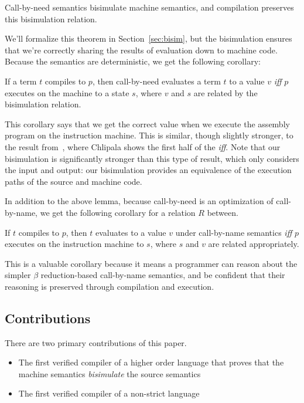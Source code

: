 \begin{theorem}
Call-by-need semantics bisimulate machine semantics, and compilation
preserves this bisimulation relation.
\end{theorem}

We'll formalize this theorem in Section~\ref{sec:bisim}, but the bisimulation
ensures that we're correctly sharing the results of evaluation down to machine
code. Because the semantics are deterministic, we get the following corollary:   

\begin{corollary}
If a term $t$ compiles to $p$, then call-by-need evaluates a term $t$ to a value
$v$ \emph{iff} $p$ executes on the machine to a state $s$, where $v$ and $s$ are
related by the bisimulation relation.
\end{corollary}

This corollary says that we get the correct value when we execute the assembly
program on the instruction machine. This is similar, though slightly stronger,
to the result from~\cite{chlipala2007certified}, where Chlipala shows the first
half of the \emph{iff}. Note that our bisimulation is significantly stronger
than this type of result, which only considers the input and output: our
bisimulation provides an equivalence of the execution paths of the source and
machine code.

In addition to the above lemma, because call-by-need is an optimization of
call-by-name, we get the following corollary for a relation $R$ between.

\begin{corollary}
If $t$ compiles to $p$, then $t$ evaluates to a value $v$ under call-by-name
semantics \emph{iff} $p$ executes on the instruction machine to $s$, where $s$
and $v$ are related appropriately.
\end{corollary}

This is a valuable corollary because it means a programmer can reason about the
simpler $\beta$ reduction-based call-by-name semantics, and be confident that
their reasoning is preserved through compilation and execution.

\subsection{Contributions}
There are two primary contributions of this paper. 
\begin{itemize}
\item The first verified compiler of a higher order language that proves that
the machine semantics \emph{bisimulate} the source semantics
\item The first verified compiler of a non-strict language
\end{itemize}

